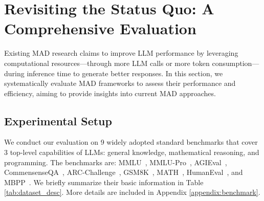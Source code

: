 
\section{Revisiting the Status Quo: A Comprehensive Evaluation} \label{sec:exp}

Existing MAD research claims to improve LLM performance by leveraging computational resources---through more LLM calls or more token consumption---during inference time to generate better responses. 
In this section, we systematically evaluate MAD frameworks to assess their performance and efficiency, aiming to provide insights into current MAD approaches. 


\subsection{Experimental Setup}
 We conduct our evaluation on 9 widely adopted standard benchmarks that cover 3 top-level capabilities of LLMs: general knowledge, mathematical reasoning, and programming. The benchmarks are:  MMLU~\citep{mmlu1}, MMLU-Pro~\citep{mmlupro}, AGIEval~\citep{agieval}, CommensenseQA~\citep{csqa}, ARC-Challenge~\citep{arc}, GSM8K~\citep{gsm8k}, MATH~\citep{math}, HumanEval~\citep{humaneval}, and MBPP~\citep{mbpp}.  
We briefly summarize their basic information in Table \ref{tab:dataset_desc}. More details are included in Appendix \ref{appendix:benchmark}.

